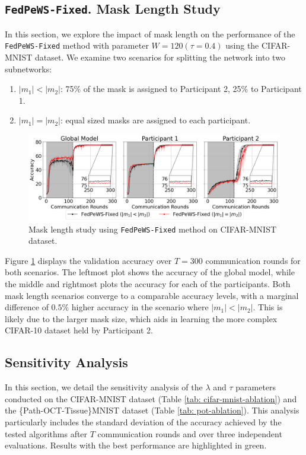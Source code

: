\documentclass{article}
\begin{document}
\subsection{\texttt{FedPeWS-Fixed}. Mask Length Study} 
In this section, we explore the impact of mask length on the performance of the \texttt{FedPeWS-Fixed} method with parameter $W=120 (\tau=0.4)$ using the CIFAR-MNIST dataset. We examine two scenarios for splitting the network into two subnetworks: 
\begin{enumerate}
    \item $|m_1| < |m_2|$: 75\% of the mask is assigned to Participant 2, 25\% to Participant 1. 
    \item $|m_1| = |m_2|$: equal sized masks are assigned to each participant. 
\end{enumerate}

\begin{figure}[ht] 
    \centering
    \includegraphics[width=0.75\linewidth]{images/mask-length-study-v2.pdf} 
    \caption{Mask length study using \texttt{FedPeWS-Fixed} method on CIFAR-MNIST dataset. }
    \label{fig: mask-length-study}
\end{figure} 

Figure \ref{fig: mask-length-study} displays the validation accuracy over $T=300$ communication rounds for both scenarios. The leftmost plot shows the accuracy of the global model, while the middle and rightmost plots the accuracy for each of the participants. Both mask length scenarios converge to a comparable accuracy levels, with a marginal difference of $0.5\%$ higher accuracy in the scenario where $|m_1| < |m_2|$. This is likely due to the larger mask size, which aids in learning the more complex CIFAR-10 dataset held by Participant 2. 


\subsection{Sensitivity Analysis} 
In this section, we detail the sensitivity analysis of the $\lambda$ and $\tau$ parameters conducted on the CIFAR-MNIST dataset (Table \ref{tab: cifar-mnist-ablation}) and the \{Path-OCT-Tissue\}MNIST dataset (Table \ref{tab: pot-ablation}). This analysis particularly includes the standard deviation of the accuracy achieved by the tested algorithms after $T$ communication rounds and over three independent evaluations. Results with the best performance are highlighted in green. 
\end{document}

